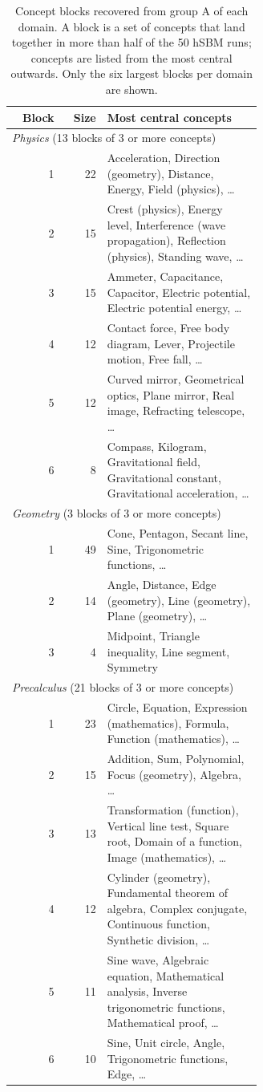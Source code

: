 \begin{table}[t]
  \centering
  \caption{Concept blocks recovered from group A of each domain. A block is a set of concepts that land together in more than half of the 50 hSBM runs; concepts are listed from the most central outwards. Only the six largest blocks per domain are shown.}
  \label{tab:blocks}
  \begin{tabular}{rrp{0.62\linewidth}}
    \toprule
    Block & Size & Most central concepts \\
    \midrule
    \multicolumn{3}{l}{\emph{Physics} (13 blocks of 3 or more concepts)} \\
    1 & 22 & Acceleration, Direction (geometry), Distance, Energy, Field (physics), \ldots \\
    2 & 15 & Crest (physics), Energy level, Interference (wave propagation), Reflection (physics), Standing wave, \ldots \\
    3 & 15 & Ammeter, Capacitance, Capacitor, Electric potential, Electric potential energy, \ldots \\
    4 & 12 & Contact force, Free body diagram, Lever, Projectile motion, Free fall, \ldots \\
    5 & 12 & Curved mirror, Geometrical optics, Plane mirror, Real image, Refracting telescope, \ldots \\
    6 & 8 & Compass, Kilogram, Gravitational field, Gravitational constant, Gravitational acceleration, \ldots \\
    \midrule
    \multicolumn{3}{l}{\emph{Geometry} (3 blocks of 3 or more concepts)} \\
    1 & 49 & Cone, Pentagon, Secant line, Sine, Trigonometric functions, \ldots \\
    2 & 14 & Angle, Distance, Edge (geometry), Line (geometry), Plane (geometry), \ldots \\
    3 & 4 & Midpoint, Triangle inequality, Line segment, Symmetry \\
    \midrule
    \multicolumn{3}{l}{\emph{Precalculus} (21 blocks of 3 or more concepts)} \\
    1 & 23 & Circle, Equation, Expression (mathematics), Formula, Function (mathematics), \ldots \\
    2 & 15 & Addition, Sum, Polynomial, Focus (geometry), Algebra, \ldots \\
    3 & 13 & Transformation (function), Vertical line test, Square root, Domain of a function, Image (mathematics), \ldots \\
    4 & 12 & Cylinder (geometry), Fundamental theorem of algebra, Complex conjugate, Continuous function, Synthetic division, \ldots \\
    5 & 11 & Sine wave, Algebraic equation, Mathematical analysis, Inverse trigonometric functions, Mathematical proof, \ldots \\
    6 & 10 & Sine, Unit circle, Angle, Trigonometric functions, Edge, \ldots \\
    \bottomrule
  \end{tabular}
\end{table}
